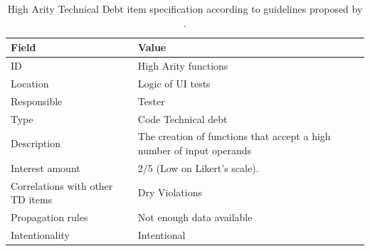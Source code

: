     \begin{table}[!htbp]
		\centering
		\tabulinesep=1.2mm
		\begin{tabu} to \textwidth {|X|X[3]|}

			\hline
			\textbf{Field} & \textbf{Value} \\
			\hline

			ID & High Arity functions\\
			\hline

			Location & Logic of UI tests \\
			\hline

			Responsible & Tester \\
			\hline

			Type & Code Technical debt \\
			\hline

			Description & The creation of functions that accept a high number of input operands \\
			\hline



			Interest amount &  2/5 (Low on Likert's scale). \\
			\hline



			Correlations with other TD items & Dry Violations\\
			\hline



			Propagation rules & Not enough data available\\
			\hline

			Intentionality & Intentional \\
			\hline

		\end{tabu}
		\label{tab:res-high-arity}
		\caption[High Arity TD item specification]{High Arity Technical Debt item specification according to guidelines proposed by \cite{mapping_study_td}.}
	\end{table}





